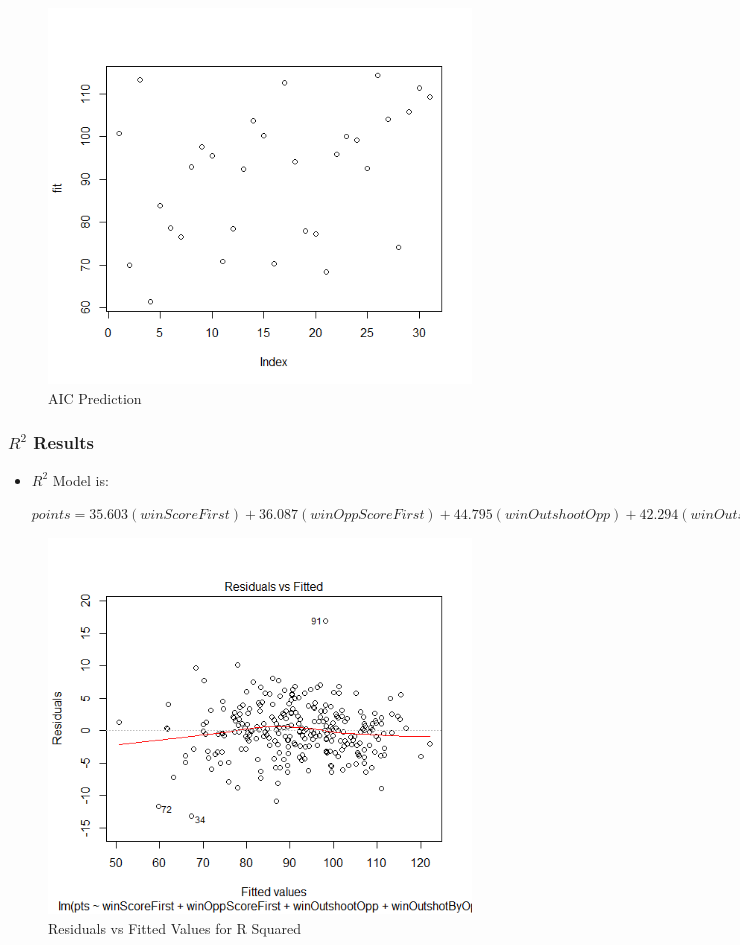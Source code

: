 \documentclass{beamer}
\begin{document}
\begin{frame}
	\begin{itemize}
	\begin{figure}
	\centering
	\includegraphics[width=0.7\linewidth]{"AIC Prediction"}
	\caption{AIC Prediction}
	\label{fig:AIC Prediction}
\end{figure}	
	\end{itemize}
\end{frame}
\begin{frame}
\frametitle{$R^2$ Results}
\begin{itemize}
	\item $R^2$ Model is:
	\begin{center}$
		points = 35.603(winScoreFirst) + 36.087(winOppScoreFirst) + 44.795(winOutshootOpp) + 42.294(winOutshotByOpp) + 12.525  
		$\end{center}
\end{itemize}
\end{frame}
\begin{frame}
	\begin{itemize}
		\begin{figure}
			\centering
			\includegraphics[width=0.7\linewidth]{R1}
			\caption{Residuals vs Fitted Values for R Squared}
			\label{fig:Residuals vs Fitted Values for R Squared}
		\end{figure}
	\end{itemize}
\end{frame}
\end{document}
